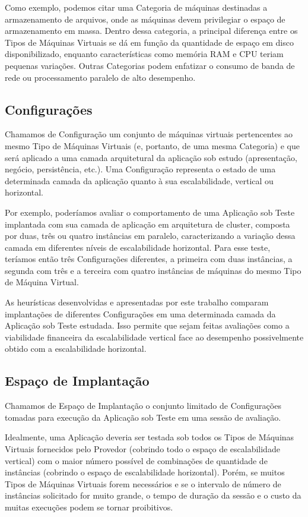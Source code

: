 Como exemplo, podemos citar uma Categoria de máquinas destinadas a armazenamento 
de arquivos, onde as máquinas devem privilegiar o espaço de armazenamento em 
massa. Dentro dessa categoria, a principal diferença entre os Tipos de Máquinas 
Virtuais se dá em função da quantidade de espaço em disco disponibilizado, 
enquanto características como memória RAM e CPU teriam pequenas variações. 
Outras Categorias podem enfatizar o consumo de banda de rede ou processamento 
paralelo de alto desempenho.

\subsection{Configurações}
Chamamos de Configuração um conjunto de máquinas virtuais pertencentes ao mesmo 
Tipo de Máquinas Virtuais (e, portanto, de uma mesma Categoria) e que será 
aplicado a uma camada arquitetural da aplicação sob estudo (apresentação, 
negócio, persistência, etc.). Uma Configuração representa o estado de uma 
determinada camada da aplicação quanto à sua escalabilidade, vertical ou horizontal.

Por exemplo, poderíamos avaliar o comportamento de uma Aplicação sob Teste 
implantada com sua camada de aplicação em arquitetura de cluster, composta por 
duas, três ou quatro instâncias em paralelo, caracterizando a variação dessa 
camada em diferentes níveis de escalabilidade horizontal. Para esse teste, 
teríamos então três Configurações diferentes, a primeira com duas instâncias, a 
segunda com três e a terceira com quatro instâncias de máquinas do mesmo Tipo de 
Máquina Virtual.

As heurísticas desenvolvidas e apresentadas por este trabalho comparam 
implantações de diferentes Configurações em uma determinada camada da Aplicação 
sob Teste estudada. Isso permite que sejam feitas avaliações como a viabilidade 
financeira da escalabilidade vertical face ao desempenho possivelmente obtido 
com a escalabilidade horizontal.

\subsection{Espaço de Implantação}
Chamamos de Espaço de Implantação o conjunto limitado de Configurações tomadas 
para execução da Aplicação sob Teste em uma sessão de avaliação.
 
Idealmente, uma Aplicação deveria ser testada sob todos os Tipos de Máquinas 
Virtuais fornecidos pelo Provedor (cobrindo todo o espaço de escalabilidade 
vertical) com o maior número possível de combinações de quantidade de instâncias 
(cobrindo o espaço de escalabilidade horizontal). Porém, se muitos Tipos de 
Máquinas Virtuais forem necessários e se o intervalo de número de instâncias 
solicitado for muito grande, o tempo de duração da sessão e o custo da muitas 
execuções podem se tornar proibitivos.

